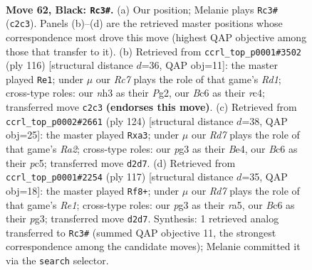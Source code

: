 \documentclass[11pt]{article}
\begin{document}
\clearpage

\begin{figure}[p]\centering
\begin{subfigure}{0.46\textwidth}\centering
\resizebox{\linewidth}{!}{%
\newchessgame
\chessboard[
  setfen={8/6k1/1pb5/p7/2p5/K5PN/2rr1R1P/8 b - - 1 62},
  showmover=false,
  pgfstyle=straightmove, color=movearrow, markmove={c2-c3}
]}
\caption{}
\end{subfigure}\hfill
\begin{subfigure}{0.46\textwidth}\centering
\resizebox{\linewidth}{!}{%
\newchessgame
\chessboard[
  setfen={8/8/3Rb1p1/2P1k2p/2r5/4p3/6P1/3R2K1 w - - 3 59},
  showmover=false,
  pgfstyle=straightmove, color=movearrow, markmove={d1-e1}
]}
\caption{}
\end{subfigure}
\\[4pt]
\begin{subfigure}{0.46\textwidth}\centering
\resizebox{\linewidth}{!}{%
\newchessgame
\chessboard[
  setfen={8/r7/P2p4/2pP2k1/2n1B3/r7/R3R3/4K3 w - - 12 63},
  showmover=false,
  pgfstyle=straightmove, color=movearrow, markmove={a2-a3}
]}
\caption{}
\end{subfigure}\hfill
\begin{subfigure}{0.46\textwidth}\centering
\resizebox{\linewidth}{!}{%
\newchessgame
\chessboard[
  setfen={2r1r3/8/3k4/R7/P7/2p1RKP1/1pB5/8 b - - 0 59},
  showmover=false,
  pgfstyle=straightmove, color=movearrow, markmove={e8-f8}
]}
\caption{}
\end{subfigure}
\caption{\textbf{Move 62, Black: \texttt{Rc3\#}.} (a) Our position; Melanie plays \texttt{Rc3\#} (\texttt{c2c3}). Panels (b)--(d) are the retrieved master positions whose correspondence most drove this move (highest QAP objective among those that transfer to it). (b) Retrieved from \texttt{ccrl\_top\_p0001\#3502} (ply 116) [structural distance $d$=36, QAP obj=11]: the master played \texttt{Re1}; under $\mu$ our \emph{Rc7} plays the role of that game's \emph{Rd1}; cross-type roles: our \emph{n}h3 as their \emph{P}g2, our \emph{B}c6 as their \emph{r}c4; transferred move \texttt{c2c3} \textbf{(endorses this move)}. (c) Retrieved from \texttt{ccrl\_top\_p0002\#2661} (ply 124) [structural distance $d$=38, QAP obj=25]: the master played \texttt{Rxa3}; under $\mu$ our \emph{Rd7} plays the role of that game's \emph{Ra2}; cross-type roles: our \emph{p}g3 as their \emph{B}e4, our \emph{B}c6 as their \emph{p}c5; transferred move \texttt{d2d7}. (d) Retrieved from \texttt{ccrl\_top\_p0001\#2254} (ply 117) [structural distance $d$=35, QAP obj=18]: the master played \texttt{Rf8+}; under $\mu$ our \emph{Rd7} plays the role of that game's \emph{Re1}; cross-type roles: our \emph{p}g3 as their \emph{r}a5, our \emph{B}c6 as their \emph{p}g3; transferred move \texttt{d2d7}. Synthesis: 1 retrieved analog transferred to \texttt{Rc3\#} (summed QAP objective 11, the strongest correspondence among the candidate moves); Melanie committed it via the \texttt{search} selector.}
\label{fig:thought-m123}
\end{figure}
\end{document}
